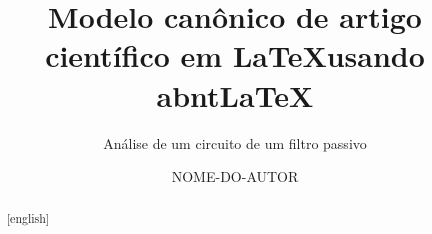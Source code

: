 \documentclass[oneside]{abntlatex}
\title        {Modelo canônico de artigo científico em \LaTeX usando abnt\LaTeX}
\subtitle     {Análise de um circuito de um filtro passivo}
\author       {NOME-DO-AUTOR}
\date         {\the\year}
\begin{document}
  \pretext%
  \maketitle %

  \backcover%
  \intercatalog%
  \begin{abstract}%
    \lipsum[1-1]
  \end{abstract}
  \begin{abstract}[english]%
    \lipsum[1-1]
  \end{abstract}             
  \listoffigures%
  \listoftables%
  \tableofcontents\cleardoublepage%

  \maintext%

  

  

  

  \backtext%
\end{document}
